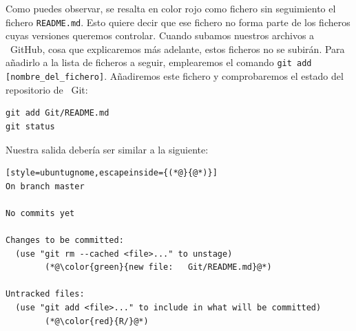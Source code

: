 \documentclass[11pt,a4paper]{article}
\newcommand{\Git}{\textcolor{git}{\faIcon{git-alt}}~\!Git}
\newcommand{\GitHub}{\faIcon{github}~\!GitHub}
\theoremstyle{exercise}
\begin{document}
\noindent Como puedes observar, se resalta en color rojo como fichero sin seguimiento el fichero \texttt{README.md}. Esto quiere decir que ese fichero no forma parte de los ficheros cuyas versiones queremos controlar. Cuando subamos nuestros archivos a \GitHub, cosa que explicaremos más adelante, estos ficheros no se subirán. Para añadirlo a la lista de ficheros a seguir, emplearemos el comando \texttt{git add [nombre\_del\_fichero]}. Añadiremos este fichero y comprobaremos el estado del repositorio de \Git:

\begin{lstlisting}[style=ubuntugnome]
git add Git/README.md
git status
\end{lstlisting}

\noindent Nuestra salida debería ser similar a la siguiente:

\begin{lstlisting}[style=ubuntugnome,escapeinside={(*@}{@*)}]
On branch master

No commits yet

Changes to be committed:
  (use "git rm --cached <file>..." to unstage)
        (*@\color{green}{new file:   Git/README.md}@*)

Untracked files:
  (use "git add <file>..." to include in what will be committed)
        (*@\color{red}{R/}@*)
\end{lstlisting}
\end{document}
